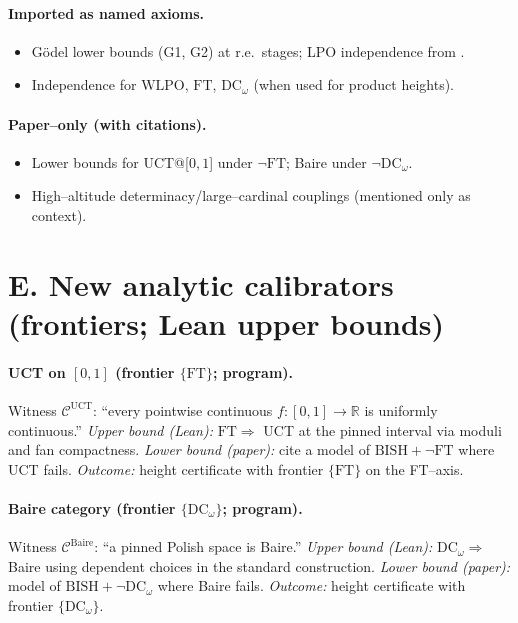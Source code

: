 \documentclass[11pt]{article}
\theoremstyle{definition}
\theoremstyle{remark}
\newcommand{\WLPO}{\mathrm{WLPO}}
\newcommand{\BISH}{\mathrm{BISH}}
\newcommand{\DCw}{\mathrm{DC}_\omega}
\newcommand{\FT}{\mathrm{FT}}
\begin{document}
\paragraph{Imported as named axioms.}
\begin{itemize}
\item G\"odel lower bounds (G1, G2) at r.e.\ stages; LPO independence from \HA.
\item Independence for $\WLPO$, $\FT$, $\DCw$ (when used for product heights).
\end{itemize}

\paragraph{Paper–only (with citations).}
\begin{itemize}
\item Lower bounds for UCT@[$0,1$] under $\neg\FT$; Baire under $\neg\DCw$.
\item High–altitude determinacy/large–cardinal couplings (mentioned only as context).
\end{itemize}

\section{E. New analytic calibrators (frontiers; Lean upper bounds)}

\paragraph{UCT on $[0,1]$ (frontier $\{\FT\}$; program).}
Witness $\mathcal C^{\mathrm{UCT}}$: ``every pointwise continuous $f:[0,1]\to\mathbb R$ is uniformly continuous.''  
\emph{Upper bound (Lean):} $\FT\Rightarrow$ UCT at the pinned interval via moduli and fan compactness.  
\emph{Lower bound (paper):} cite a model of $\BISH+\neg\FT$ where UCT fails.  
\emph{Outcome:} height certificate with frontier $\{\FT\}$ on the FT–axis.

\paragraph{Baire category (frontier $\{\DCw\}$; program).}
Witness $\mathcal C^{\mathrm{Baire}}$: ``a pinned Polish space is Baire.''  
\emph{Upper bound (Lean):} $\DCw\Rightarrow$ Baire using dependent choices in the standard construction.  
\emph{Lower bound (paper):} model of $\BISH+\neg\DCw$ where Baire fails.  
\emph{Outcome:} height certificate with frontier $\{\DCw\}$.
\end{document}
